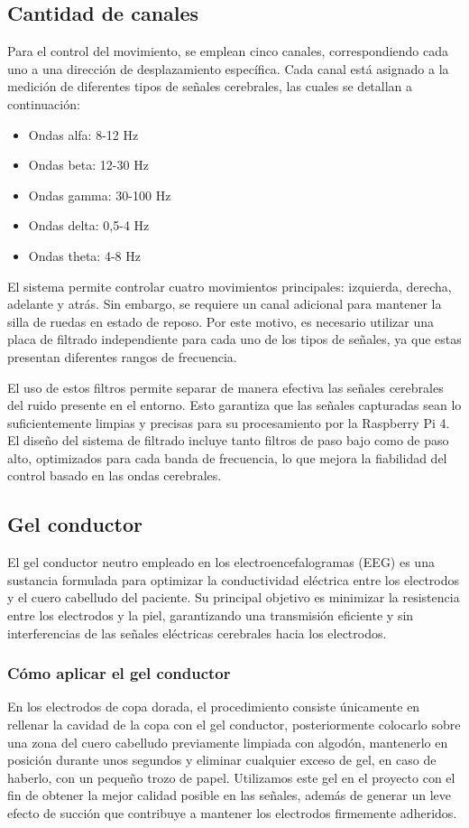 \documentclass{article}
\begin{document}
\subsection{Cantidad de canales}
Para el control del movimiento, se emplean cinco canales, correspondiendo cada uno a una dirección de desplazamiento específica. Cada canal está asignado a la medición de diferentes tipos de señales cerebrales, las cuales se detallan a continuación:

\begin{itemize}
    \item Ondas alfa: 8-12 Hz
    \item Ondas beta: 12-30 Hz
    \item Ondas gamma: 30-100 Hz
    \item Ondas delta: 0,5-4 Hz
    \item Ondas theta: 4-8 Hz
\end{itemize}

El sistema permite controlar cuatro movimientos principales: izquierda, derecha, adelante y atrás. Sin embargo, se requiere un canal adicional para mantener la silla de ruedas en estado de reposo. Por este motivo, es necesario utilizar una placa de filtrado independiente para cada uno de los tipos de señales, ya que estas presentan diferentes rangos de frecuencia.

El uso de estos filtros permite separar de manera efectiva las señales cerebrales del ruido presente en el entorno. Esto garantiza que las señales capturadas sean lo suficientemente limpias y precisas para su procesamiento por la Raspberry Pi 4. El diseño del sistema de filtrado incluye tanto filtros de paso bajo como de paso alto, optimizados para cada banda de frecuencia, lo que mejora la fiabilidad del control basado en las ondas cerebrales.


\subsection{Gel conductor}
El gel conductor neutro empleado en los electroencefalogramas (EEG) es una sustancia formulada para optimizar la conductividad eléctrica entre los electrodos y el cuero cabelludo del paciente. Su principal objetivo es minimizar la resistencia entre los electrodos y la piel, garantizando una transmisión eficiente y sin interferencias de las señales eléctricas cerebrales hacia los electrodos. 

\subsubsection{Cómo aplicar el gel conductor}
En los electrodos de copa dorada, el procedimiento consiste únicamente en rellenar la cavidad de la copa con el gel conductor, posteriormente colocarlo sobre una zona del cuero cabelludo previamente limpiada con algodón, mantenerlo en posición durante unos segundos y eliminar cualquier exceso de gel, en caso de haberlo, con un pequeño trozo de papel. Utilizamos este gel en el proyecto con el fin de obtener la mejor calidad posible en las señales, además de generar un leve efecto de succión que contribuye a mantener los electrodos firmemente adheridos.
\end{document}
